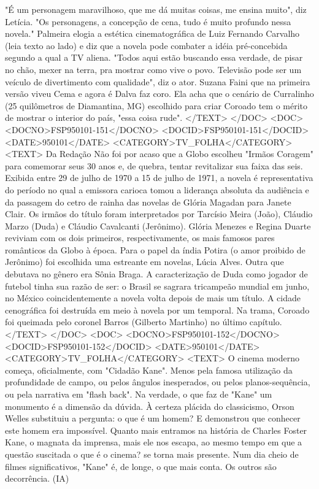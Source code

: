 "É um personagem maravilhoso, que me dá muitas coisas, me ensina muito", diz Letícia. "Os personagens, a concepção de cena, tudo é muito profundo nessa novela."
Palmeira elogia a estética cinematográfica de Luiz Fernando Carvalho (leia texto ao lado) e diz que a novela pode combater a idéia pré-concebida segundo a qual a TV aliena.
"Todos aqui estão buscando essa verdade, de pisar no chão, mexer na terra, pra mostrar como vive o povo. Televisão pode ser um veículo de divertimento com qualidade", diz o ator.
Suzana Faini que na primeira versão viveu Cema e agora é Dalva faz coro. Ela acha que o cenário de Curralinho (25 quilômetros de Diamantina, MG) escolhido para criar Coroado tem o mérito de mostrar o interior do país, "essa coisa rude".
</TEXT>
</DOC>
<DOC>
<DOCNO>FSP950101-151</DOCNO>
<DOCID>FSP950101-151</DOCID>
<DATE>950101</DATE>
<CATEGORY>TV_FOLHA</CATEGORY>
<TEXT>
Da Redação 
Não foi por acaso que a Globo escolheu "Irmãos Coragem" para comemorar seus 30 anos e, de quebra, tentar revitalizar sua faixa das seis.
Exibida entre 29 de julho de 1970 a 15 de julho de 1971, a novela é representativa do período no qual a emissora carioca tomou a liderança absoluta da audiência e da passagem do cetro de rainha das novelas de Glória Magadan para Janete Clair.
Os irmãos do título foram interpretados por Tarcísio Meira (João), Cláudio Marzo (Duda) e Cláudio Cavalcanti (Jerônimo). Glória Menezes e Regina Duarte reviviam com os dois primeiros, respectivamente, os mais famosos pares românticos da Globo à época.
Para o papel da índia Potira (o amor proibido de Jerônimo) foi escolhida uma estreante em novelas, Lúcia Alves. Outra que debutava no gênero era Sônia Braga.
A caracterização de Duda como jogador de futebol tinha sua razão de ser: o Brasil se sagrara tricampeão mundial em junho, no México coincidentemente a novela volta depois de mais um título.
A cidade cenográfica foi destruída em meio à novela por um temporal. Na trama, Coroado foi queimada pelo coronel Barros (Gilberto Martinho) no último capítulo.
</TEXT>
</DOC>
<DOC>
<DOCNO>FSP950101-152</DOCNO>
<DOCID>FSP950101-152</DOCID>
<DATE>950101</DATE>
<CATEGORY>TV_FOLHA</CATEGORY>
<TEXT>
O cinema moderno começa, oficialmente, com "Cidadão Kane". Menos pela famosa utilização da profundidade de campo, ou pelos ângulos inesperados, ou pelos planos-sequência, ou pela narrativa em "flash back". Na verdade, o que faz de "Kane" um monumento é a dimensão da dúvida. À certeza plácida do classicismo, Orson Welles substituiu a pergunta: o que é um homem? E demonstrou que conhecer este homem era impossível. Quanto mais entramos na história de Charles Foster Kane, o magnata da imprensa, mais ele nos escapa, ao mesmo tempo em que a questão suscitada o que é o cinema? se torna mais presente. Num dia cheio de filmes significativos, "Kane" é, de longe, o que mais conta. Os outros são decorrência. (IA)

